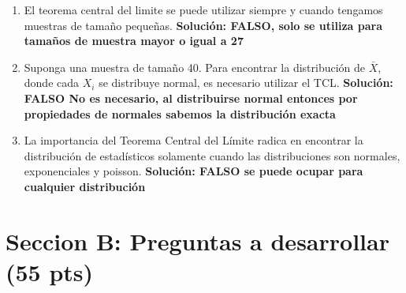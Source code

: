 \documentclass[addpoints]{exam}
\theoremstyle{mytheor}
\begin{document}
\begin{questions}
\begin{enumerate}
  
  \item El teorema central del limite se puede utilizar siempre y cuando tengamos muestras de tamaño pequeñas.
  \subitem \textbf{Solución: FALSO, solo se utiliza para tamaños de muestra mayor o igual a 27}
  
  
  \item Suponga una muestra de tamaño 40. Para encontrar la distribución de $\bar{X}$, donde cada $X_i$ se distribuye normal, es necesario utilizar el TCL.
  \subitem \textbf{Solución: FALSO No es necesario, al distribuirse normal entonces por propiedades de normales sabemos la distribución exacta}
  
  \item La importancia del Teorema Central del Límite radica en encontrar la distribución de estadísticos solamente cuando las distribuciones son normales, exponenciales y poisson. 
  \subitem \textbf{Solución: FALSO se puede ocupar para cualquier distribución}
  
  \end{enumerate}
  
  \end{questions}
  
  \section*{Seccion B: Preguntas a desarrollar (55 pts)}
  
\end{document}
